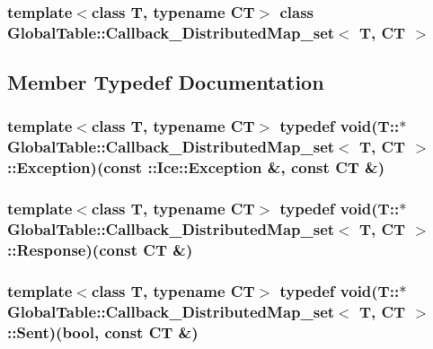 \subsubsection*{template$<$class T, typename CT$>$ class GlobalTable::Callback\_\-DistributedMap\_\-set$<$ T, CT $>$}



\subsection{Member Typedef Documentation}
\hypertarget{class_global_table_1_1_callback___distributed_map__set_a35bb7faf0c39455b3c6216c7c2d35b0f}{
\subsubsection[{Exception}]{\setlength{\rightskip}{0pt plus 5cm}template$<$class T, typename CT$>$ typedef void(T::$\ast$ {\bf GlobalTable::Callback\_\-DistributedMap\_\-set}$<$ T, CT $>$::{\bf Exception})(const ::Ice::Exception \&, const CT \&)}}
\label{class_global_table_1_1_callback___distributed_map__set_a35bb7faf0c39455b3c6216c7c2d35b0f}
\hypertarget{class_global_table_1_1_callback___distributed_map__set_aff2fdd8c179bf018ed543b3153991bf9}{
\subsubsection[{Response}]{\setlength{\rightskip}{0pt plus 5cm}template$<$class T, typename CT$>$ typedef void(T::$\ast$ {\bf GlobalTable::Callback\_\-DistributedMap\_\-set}$<$ T, CT $>$::{\bf Response})(const CT \&)}}
\label{class_global_table_1_1_callback___distributed_map__set_aff2fdd8c179bf018ed543b3153991bf9}
\hypertarget{class_global_table_1_1_callback___distributed_map__set_acb1788ee23e85c2b36536177fc33e7d7}{
\subsubsection[{Sent}]{\setlength{\rightskip}{0pt plus 5cm}template$<$class T, typename CT$>$ typedef void(T::$\ast$ {\bf GlobalTable::Callback\_\-DistributedMap\_\-set}$<$ T, CT $>$::{\bf Sent})(bool, const CT \&)}}
